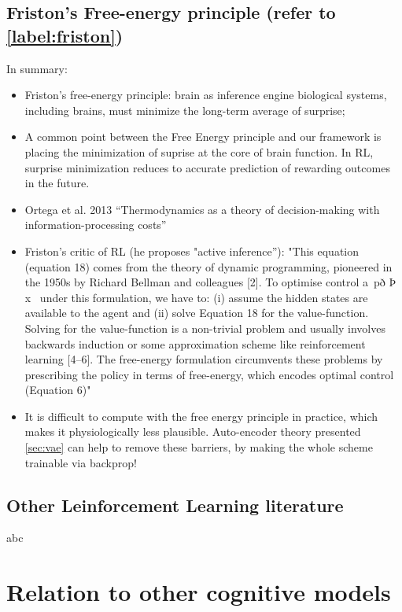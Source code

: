 \documentclass[10pt,letterpaper]{article}
\begin{document}
\subsection{Friston's Free-energy principle (refer to \ref{label:friston})}
In summary:
\begin{itemize}
  \item Friston's free-energy principle: brain as inference engine
  biological systems, including brains, must minimize the long-term average of surprise;
  \item A common point between the Free Energy principle and our framework
  is placing the minimization of suprise at the core of brain function.
  In RL, surprise minimization reduces to accurate prediction of
  rewarding outcomes in the future.
  \item Ortega et al. 2013 \citep{ortega2013thermodynamics} ``Thermodynamics as a theory of decision-making with information-processing costs''
\item Friston's critic of RL \citep{fristonAIorRL} (he proposes "active inference''): "This equation (equation 18) comes from the theory of dynamic programming,
pioneered in the 1950s by Richard Bellman and colleagues [2]. To
optimise control a~pð Þ x~ under this formulation, we have to: (i)
assume the hidden states are available to the agent and (ii) solve
Equation 18 for the value-function. Solving for the value-function
is a non-trivial problem and usually involves backwards induction
or some approximation scheme like reinforcement learning [4–6].
The free-energy formulation circumvents these problems by
prescribing the policy in terms of free-energy, which encodes
optimal control (Equation 6)"
\item It is difficult to compute with the free energy principle
  in practice, which makes it physiologically less plausible. Auto-encoder theory presented
  \ref{sec:vae} can help to remove these barriers, by making the whole scheme trainable via
  backprop!
  \end{itemize}


\subsection{Other Leinforcement Learning literature}
abc

\section{Relation to other cognitive models}
\end{document}
